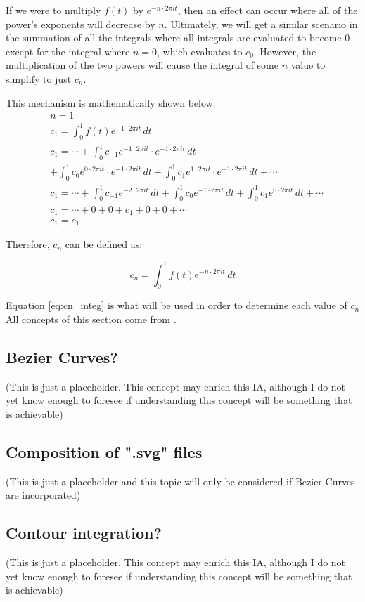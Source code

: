 \documentclass[letterpaper, 12pt]{article}
\begin{document}
If we were to multiply \(f(t)\) by \(e^{-n \cdot 2\pi it}\), then an effect can occur
where all of the power's exponents will decrease by \(n\). Ultimately, we will
get a similar scenario in the summation of all the integrals where
all integrals are evaluated to become 0 except for the integral
where \(n = 0\), which evaluates to \(c_0\). However, the multiplication
of the two powers will cause the integral of some \(n\) value to simplify to just
\(c_n\).

This mechanism is mathematically shown below.
\begin{align*}
     & n = 1
    \\
     & c_1 = \int_{0}^{1} f(t) e^{-1 \cdot 2\pi it} \,dt
    \\
     & c_1 = \cdots + \int_{0}^{1} c_{-1} e^{-1 \cdot 2\pi it} \cdot e^{-1 \cdot 2\pi it} \,dt
    \\
     & + \int_{0}^{1} c_{0} e^{0 \cdot 2\pi it} \cdot e^{-1 \cdot 2\pi it} \,dt + \int_{0}^{1} c_{1} e^{1 \cdot 2\pi it} \cdot e^{-1 \cdot 2\pi it} \,dt + \cdots
    \\
     & c_1 = \cdots + \int_{0}^{1} c_{-1} e^{-2 \cdot 2\pi it} \,dt + \int_{0}^{1} c_{0} e^{-1 \cdot 2\pi it} \,dt + \int_{0}^{1} c_{1} e^{0 \cdot 2\pi it} \,dt + \cdots
    \\
     & c_1 = \cdots + 0 + 0 + c_1 + 0 + 0 + \cdots
    \\
     & c_1 = c_1
\end{align*}

Therefore, \(c_n\) can be defined as:

\begin{equation}
    c_n = \int_{0}^{1} f(t) e^{-n \cdot 2\pi it} \,dt
    \label{eq:cn_integ}
\end{equation}

Equation \ref*{eq:cn_integ} is what will be used in order to
determine each value of \(c_n\)
\\

All concepts of this section come from \cite{sandersonWhatFourierSeries2019}.


\subsection{Bezier Curves?}
(This is just a placeholder. This concept may enrich this IA, although
I do not yet know enough to foresee if understanding this concept
will be something that is achievable)


\subsection{Composition of ".svg" files}
(This is just a placeholder and this topic will only be considered
if Bezier Curves are incorporated)


\subsection{Contour integration?}
(This is just a placeholder. This concept may enrich this IA, although
I do not yet know enough to foresee if understanding this concept
will be something that is achievable)



\end{document}
